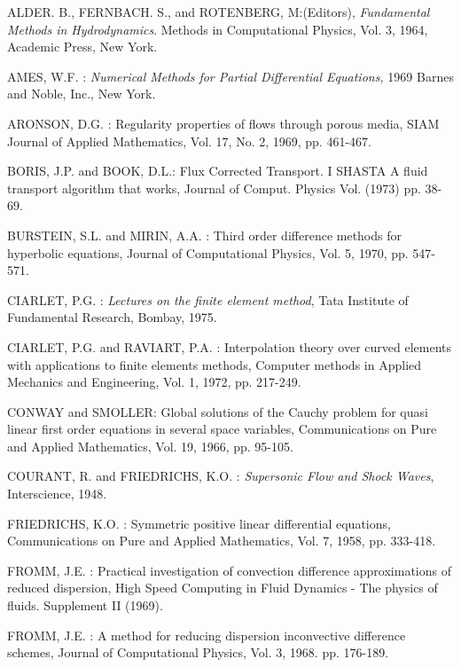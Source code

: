 \begin{thebibliography}{99}
 ALDER. B., FERNBACH. S., and ROTENBERG,
  M:\pageoriginale  (Editors), \textit{Fundamental Methods in
    Hydrodynamics}. Methods in Computational Physics, Vol. 3, 1964,
  Academic Press, New York. 

 AMES, W.F. : \textit{Numerical Methods for Partial
  Differential Equations,} 1969 Barnes and Noble, Inc., New York. 

 ARONSON, D.G. : Regularity properties of flows through
  porous media, SIAM Journal of Applied Mathematics, Vol. 17, No. 2,
  1969, pp. 461-467. 

 BORIS, J.P. and BOOK, D.L.: Flux Corrected Transport. I
  SHASTA A fluid transport algorithm that works, Journal of
  Comput. Physics Vol. (1973) pp. 38-69. 

 BURSTEIN, S.L. and MIRIN, A.A. : Third order difference
  methods for hyperbolic equations, Journal of Computational Physics,
  Vol. 5, 1970, pp. 547-571.  

 CIARLET, P.G. : \textit{Lectures on the finite element
  method}, Tata Institute of Fundamental Research, Bombay, 1975. 

 CIARLET, P.G. and RAVIART, P.A. : Interpolation theory
  over curved elements with applications to finite elements methods,
  Computer methods in Applied Mechanics and Engineering, Vol. 1, 1972,
  pp. 217-249.  

 CONWAY and SMOLLER: Global solutions of the Cauchy
  problem for quasi linear first order equations in several space
  variables, Communications on Pure and Applied Mathematics, Vol. 19,
  1966, pp. 95-105. 

 COURANT, R. and FRIEDRICHS, K.O. : \textit{Supersonic
  Flow and Shock Waves}, Interscience, 1948. 

 FRIEDRICHS, K.O. : Symmetric positive linear
  differential equations, Communications on Pure and Applied
  Mathematics, Vol. 7, 1958, pp. 333-418.  

 FROMM, J.E. : Practical investigation of convection
  difference approximations of reduced dispersion, High Speed
  Computing in Fluid Dynamics - The physics of fluids. Supplement II
  (1969).  

 FROMM, J.E. : A method for reducing dispersion
  inconvective difference schemes, Journal of Computational Physics,
  Vol. 3, 1968. pp. 176-189.  


\end{thebibliography}
